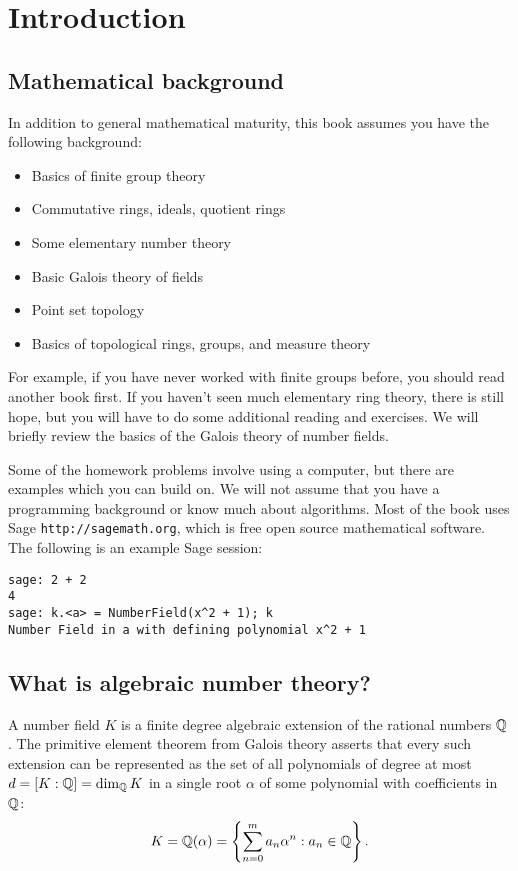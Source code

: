 \chapter{Introduction}

\section{Mathematical background}
In addition to general mathematical maturity, 
this book assumes you have the following background:
\begin{itemize}\setlength{\itemsep}{-.7ex}
\item Basics of finite group theory
\item Commutative rings, ideals, quotient rings
\item Some elementary number theory
\item Basic Galois theory of fields
\item Point set topology
\item Basics of topological rings, groups, and measure theory
\end{itemize}
For example, if you have never worked with finite groups before, you
should read another book first. If you haven't seen much elementary
ring theory, there is still hope, but you will have to do some
additional reading and exercises.  We will briefly review the basics of
the Galois theory of number fields.

Some of the homework problems involve using a computer, but there
are examples which you can build on.  We will not assume that you have
a programming background or know much about algorithms. Most
of the book uses Sage {\tt http://sagemath.org}, which is
free open source mathematical software.  The following is an example
Sage session:
\begin{verbatim}
sage: 2 + 2
4 
sage: k.<a> = NumberField(x^2 + 1); k
Number Field in a with defining polynomial x^2 + 1
\end{verbatim}

\section{What is algebraic number theory?}
A number field $K$ is a finite degree algebraic extension of the rational
numbers $\mathbb{Q}$.  The primitive element theorem from Galois theory
asserts that every such extension can be represented as the set of all
polynomials of degree at most $d = [K:\mathbb{Q}] = \dim_{\mathbb{Q}} K$ in 
a single root $\alpha$ of some polynomial with coefficients in $\mathbb{Q}$:
$$
 K = \mathbb{Q}(\alpha) = \left\{ \sum_{n=0}^{m} a_n \alpha^n : a_n\in\mathbb{Q} \right\}.
$$ 
\begin{comment}
Note that
$\Q(\alpha)$ is non-canonically isomorphic to $\Q[x]/(f)$, where $f$
is the minimal polynomial of~$\alpha$.  The isomorphism is induced by
the homomorphism $\Q[x]\to\Q(\alpha)$ that sends~$x$ to~$\alpha$,
which has kernel~$(f)$.  It is not canonical, since $\Q(\alpha)$ could
have nontrivial automorphisms.  For example, if $\alpha=\sqrt{2}$, then
$\Q(\sqrt{2})$ is isomorphic as a field to $\Q(-\sqrt{2})$ via
$\sqrt{2}\mapsto -\sqrt{2}$.  There are two isomorphisms
$\Q[x]/(x^2-2)\to \Q(\sqrt{2})$.
\end{comment}

